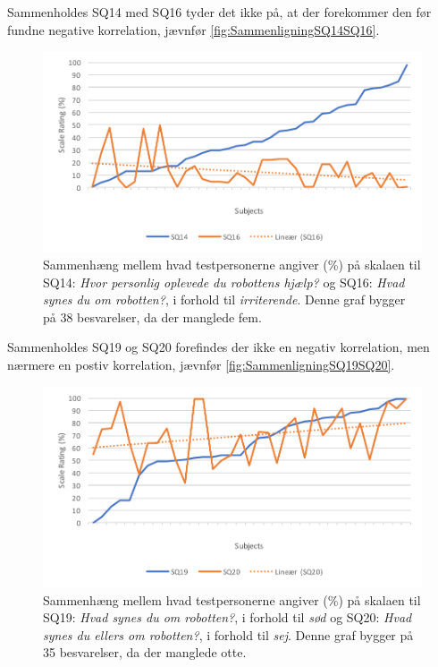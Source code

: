 Sammenholdes SQ14 med SQ16 tyder det ikke på, at der forekommer den før fundne negative korrelation, jævnfør \autoref{fig:SammenligningSQ14SQ16}.
%
\begin{figure}[H]
	\centering
	\includegraphics[width=\textwidth]{Figure/Korrelationsgrafer/SQ14+SQ16}
	\caption{Sammenhæng mellem hvad testpersonerne angiver (\%) på skalaen til SQ14: \textit{Hvor personlig oplevede du robottens hjælp?} og SQ16: \textit{Hvad synes du om robotten?}, i forhold til \textit{irriterende}. Denne graf bygger på 38 besvarelser, da der manglede fem.}
	\label{fig:SammenligningSQ14SQ16}
\end{figure}
\noindent
%
Sammenholdes SQ19 og SQ20 forefindes der ikke en negativ korrelation, men nærmere en postiv korrelation, jævnfør \autoref{fig:SammenligningSQ19SQ20}.
%
\begin{figure}[H]
	\centering
	\includegraphics[width=\textwidth]{Figure/Korrelationsgrafer/SQ19+SQ20}
	\caption{Sammenhæng mellem hvad testpersonerne angiver (\%) på skalaen til SQ19: \textit{Hvad synes du om robotten?}, i forhold til \textit{sød} og SQ20: \textit{Hvad synes du ellers om robotten?}, i forhold til \textit{sej}. Denne graf bygger på 35 besvarelser, da der manglede otte.}
	\label{fig:SammenligningSQ19SQ20}
\end{figure}
\noindent
%



